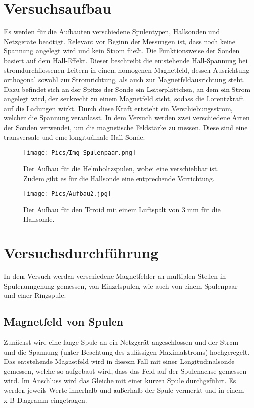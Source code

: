\documentclass[11pt]{article}
\begin{document}
\section{Versuchsaufbau}
Es werden für die Aufbauten verschiedene Spulentypen, Hallsonden und Netzgeräte benötigt.
Relevant vor Beginn der Messungen ist, dass noch keine Spannung angelegt wird und kein Strom fließt.
Die Funktionsweise der Sonden basiert auf dem Hall-Effekt.
Dieser beschreibt die entstehende Hall-Spannung bei stromdurchflossenen Leitern in einem homogenen Magnetfeld, dessen
Ausrichtung orthogonal sowohl zur Stromrichtung, als auch zur Magnetfeldausrichtung steht.
Dazu befindet sich an der Spitze der Sonde ein Leiterplättchen, an dem ein Strom angelegt wird, der senkrecht zu einem
Magnetfeld steht, sodass die Lorentzkraft auf die Ladungen wirkt.
Durch diese Kraft entsteht ein Verschiebungsstrom, welcher die Spannung veranlasst.
In dem Versuch werden zwei verschiedene Arten der Sonden verwendet, um die magnetische Feldstärke zu messen.
Diese sind eine transversale und eine longitudinale Hall-Sonde.
\begin{figure}
    \centering
    \texttt{[image: Pics/Img\_Spulenpaar.png]}
     \caption{Der Aufbau für die Helmholtzspulen, wobei eine verschiebbar ist. Zudem gibt es für die Hallsonde eine entprechende Vorrichtung.}

\end{figure}

\begin{figure}
    \centering
    \texttt{[image: Pics/Aufbau2.jpg]}
    \caption{Der Aufbau für den Toroid mit einem Luftspalt von 3 mm für die Hallsonde. }
\end{figure}
\section{Versuchsdurchführung}
In dem Versuch werden verschiedene Magnetfelder an multiplen Stellen in Spulenumgenung gemessen, von Einzelspulen, wie
auch von einem Spulenpaar und einer Ringspule.
\subsection{Magnetfeld von Spulen}
Zunächst wird eine lange Spule an ein Netzgerät angeschlossen und der Strom und die Spannung (unter Beachtung des
zulässigen Maximalstroms) hochgeregelt.
Das entstehende Magnetfeld wird in diesem Fall mit einer Longitudinalsonde gemessen, welche so aufgebaut wird, dass
das Feld auf der Spulenachse gemessen wird.
Im Anschluss wird das Gleiche mit einer kurzen Spule durchgeführt.
Es werden jeweils Werte innerhalb und außerhalb der Spule vermerkt und in einem x-B-Diagramm eingetragen.
\end{document}
